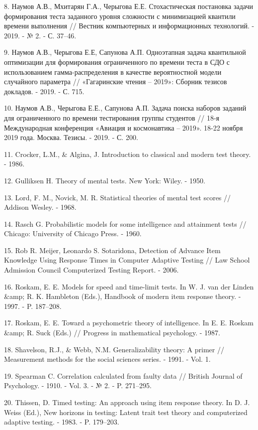\documentclass[14pt, a4paper]{extarticle}
\numberwithin{equation}{section}
\begin{document}
8.	Наумов А.В., Мхитарян Г.А., Черыгова Е.Е. Стохастическая постановка задачи формирования теста заданного уровня сложности с минимизацией квантили времени выполнения // Вестник компьютерных и информационных технологий. - 2019. - № 2. - С. 37–46.

9.	Наумов А.В., Черыгова Е.Е, Сапунова А.П. Одноэтапная задача квантильной оптимизации для формирования ограниченного по времени теста в СДО с использованием гамма-распределения в качестве вероятностной модели случайного параметра // «Гагаринские чтения – 2019»: Сборник тезисов докладов. - 2019. - С. 715.

10.	Наумов А.В., Черыгова Е.Е., Сапунова А.П. Задача поиска наборов заданий для ограниченного по времени тестирования группы студентов // 18-я Международная конференция «Авиация и космонавтика – 2019». 18-22 ноября 2019 года. Москва. Тезисы. - 2019. - С. 200.

11.	Crocker, L.M., \& Algina, J. Introduction to classical and modern test theory. - 1986.

12.	Gulliksen H. Theory of mental tests. New York: Wiley. - 1950.

13.	Lord, F. M., Novick, M. R. Statistical theories of mental test scores // Addison Wesley. - 1968.

14.	Rasch G. Probabilistic models for some intelligence and attainment tests // Chicago: University of Chicago Press. - 1960.

15.	Rob R. Meijer, Leonardo S. Sotaridona, Detection of Advance Item Knowledge Using Response Times in Computer Adaptive Testing // Law School Admission Council Computerized Testing Report. - 2006.

16.	Roskam, E. E. Models for speed and time-limit tests. In W. J. van der Linden \&amp; R. K. Hambleton (Eds.), Handbook of modern item response theory. -  1997. -  P. 187–208.

17.	Roskam, E. E. Toward a psychometric theory of intelligence. In E. E. Roskam \&amp; R. Suck (Eds.) // Progress in mathematical psychology. - 1987.

18.	Shavelson, R.J., \& Webb, N.M. Generalizability theory: A primer // Measurement methods for the social sciences series. - 1991. - Vol. 1.

19.	Spearman C. Correlation calculated from faulty data // British Journal of Psychology. - 1910. - Vol. 3. - № 2. - P. 271–295.

20.	Thissen, D. Timed testing: An approach using item response theory. In D. J. Weiss (Ed.), New horizons in testing: Latent trait test theory and computerized adaptive testing. - 1983. - P. 179–203.
\end{document}
